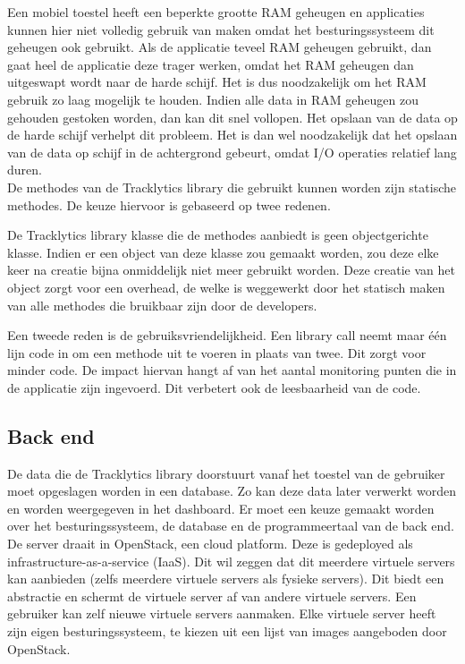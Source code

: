 Een mobiel toestel heeft een beperkte grootte RAM geheugen en applicaties kunnen hier niet volledig gebruik van maken omdat het besturingssysteem dit geheugen ook gebruikt. Als de applicatie teveel RAM geheugen gebruikt, dan gaat heel de applicatie deze trager werken, omdat het RAM geheugen dan uitgeswapt wordt naar de harde schijf. Het is dus noodzakelijk om het RAM gebruik zo laag mogelijk te houden. Indien alle data in RAM geheugen zou gehouden gestoken worden, dan kan dit snel vollopen. Het opslaan van de data op de harde schijf verhelpt dit probleem. Het is dan wel noodzakelijk dat het opslaan van de data op schijf in de achtergrond gebeurt, omdat I/O operaties relatief lang duren. \\

De methodes van de Tracklytics library die gebruikt kunnen worden zijn statische methodes. De keuze hiervoor is gebaseerd op twee redenen.

De Tracklytics library klasse die de methodes aanbiedt is geen objectgerichte klasse. Indien er een object van deze klasse zou gemaakt worden, zou deze elke keer na creatie bijna onmiddelijk niet meer gebruikt worden. Deze creatie van het object zorgt voor een overhead, de welke is weggewerkt door het statisch maken van alle methodes die bruikbaar zijn door de developers. 

Een tweede reden is de gebruiksvriendelijkheid. Een library call neemt maar \'e\'en lijn code in om een methode uit te voeren in plaats van twee. Dit zorgt voor minder code. De impact hiervan hangt af van het aantal monitoring punten die in de applicatie zijn ingevoerd. Dit verbetert ook de leesbaarheid van de code.\\

\subsection{Back end}
De data die de Tracklytics library doorstuurt vanaf het toestel van de gebruiker moet opgeslagen worden in een database. Zo kan deze data later verwerkt worden en worden weergegeven in het dashboard. Er moet een keuze gemaakt worden over het besturingssysteem, de database en de programmeertaal van de back end.\\

De server draait in OpenStack, een cloud platform. Deze is gedeployed als infrastructure-as-a-service (IaaS). Dit wil zeggen dat dit meerdere virtuele servers kan aanbieden (zelfs meerdere virtuele servers als fysieke servers). Dit biedt een abstractie en schermt de virtuele server af van andere virtuele servers. Een gebruiker kan zelf nieuwe virtuele servers aanmaken. Elke virtuele server heeft zijn eigen besturingssysteem, te kiezen uit een lijst van images aangeboden door OpenStack. 

